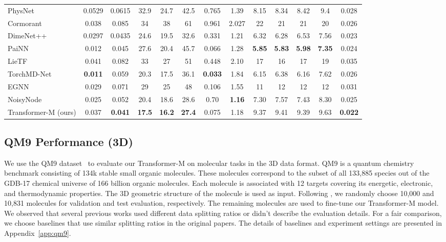 \documentclass{article} \usepackage[dvipsnames]{xcolor}
\begin{document}
\begin{table}[ht]
{\begin{tabular}{l|cccccccccccc}
PhysNet~\citep{unke2019physnet} & 0.0529 & 0.0615 & 32.9 & 24.7 & 42.5 & 0.765 & 1.39 & 8.15 & 8.34 & 8.42 & 9.4 & 0.028 \\
Cormorant~\citep{anderson2019cormorant} & 0.038 & 0.085 & 34 & 38 & 61 & 0.961 & 2.027 & 22 & 21 & 21 & 20 & 0.026 \\
DimeNet++~\citep{klicpera2020directional} & 0.0297 & 0.0435 & 24.6 & 19.5 & 32.6 & 0.331 & 1.21 & 6.32 & 6.28 & 6.53 & 7.56 & 0.023 \\
PaiNN~\citep{schutt2021equivariant} & 0.012 & 0.045 & 27.6 & 20.4 & 45.7 & 0.066 & 1.28 & \textbf{5.85} & \textbf{5.83} & \textbf{5.98} & \textbf{7.35} & 0.024 \\
LieTF~\citep{hutchinson2021lietransformer} & 0.041 & 0.082 & 33 & 27 & 51 & 0.448 & 2.10 & 17 & 16 & 17 & 19 & 0.035 \\
TorchMD-Net~\citep{tholke2021equivariant} & \textbf{0.011} & 0.059 & 20.3 & 17.5 & 36.1 & \textbf{0.033} & 1.84 & 6.15 & 6.38 & 6.16 & 7.62 & 0.026 \\ 
EGNN~\citep{satorras2021n} & 0.029 & 0.071 & 29 & 25 & 48 & 0.106 & 1.55 & 11 & 12 & 12  & 12 & 0.031 \\ NoisyNode~\citep{godwin2022simple} & 0.025 & 0.052 & 20.4 & 18.6 & 28.6 & 0.70 & \textbf{1.16} & 7.30 & 7.57 & 7.43  & 8.30 & 0.025
\\
\hline
Transformer-M (ours) & 0.037 & \textbf{0.041}  & \textbf{17.5} &\textbf{16.2} & \textbf{27.4} & 0.075 & 1.18 & 9.37 & 9.41 & 9.39 & 9.63 & \textbf{0.022} \\

\bottomrule
\end{tabular}
}
\end{table}

\vspace{-4pt}
\subsection{QM9 Performance (3D)}
\label{sec-exp-qm9}
\vspace{-4pt}
We use the QM9 dataset~\citep{ramakrishnan2014quantum} to evaluate our Transformer-M on molecular tasks in the 3D data format. QM9 is a quantum chemistry benchmark consisting of 134k stable small organic molecules. These molecules correspond to the subset of all 133,885 species out of the GDB-17 chemical universe of 166 billion organic molecules. Each molecule is associated with 12 targets covering its energetic, electronic, and thermodynamic properties. The 3D geometric structure of the molecule is used as input. Following \citet{tholke2021equivariant}, we randomly choose 10,000 and 10,831 molecules for validation and test evaluation, respectively. The remaining molecules are used to fine-tune our Transformer-M model. We observed that several previous works used different data splitting ratios or didn't describe the evaluation details. For a fair comparison, we choose baselines that use similar splitting ratios in the original papers. The details of baselines and experiment settings are presented in Appendix~\ref{app:qm9}.
\end{document}
